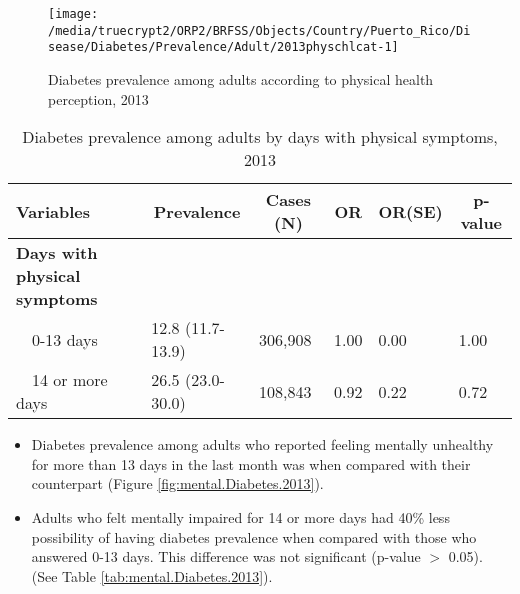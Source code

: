 \begin{figure}[H]
\caption{Diabetes prevalence among adults according to physical health perception, 2013}
\label{fig:phys.Diabetes.2013}
\begin{knitrout}
\color{fgcolor}

{\centering \texttt{[image: /media/truecrypt2/ORP2/BRFSS/Objects/Country/Puerto\_Rico/Disease/Diabetes/Prevalence/Adult/2013physchlcat-1]} 

}



\end{knitrout}
 \end{figure}

\begin{table}[H]
\caption{Diabetes prevalence among adults by days with physical symptoms, 2013\label{tab:phys.Diabetes.2013}} 
\begin{center}
\begin{tabular}{llllll}
\hline\hline
\multicolumn{1}{l}{Variables}&\multicolumn{1}{c}{Prevalence}&\multicolumn{1}{c}{Cases (N)}&\multicolumn{1}{c}{OR}&\multicolumn{1}{c}{OR(SE)}&\multicolumn{1}{c}{p-value}\tabularnewline
\hline
{\bfseries Days with physical symptoms}&&&&&\tabularnewline
~~0-13 days&12.8 (11.7-13.9)&306,908&1.00&0.00&1.00\tabularnewline
~~14 or more days&26.5 (23.0-30.0)&108,843&0.92&0.22&0.72\tabularnewline
\hline
\end{tabular}\end{center}

\end{table}


 \newpage
\begin{itemize}

\item Diabetes prevalence among adults who reported feeling mentally unhealthy for more than 13 days in the last month was  when compared with their counterpart (Figure \ref{fig:mental.Diabetes.2013}).


\item  Adults who felt mentally impaired for 14 or more days had 40\% less possibility of having diabetes prevalence when compared with those who answered 0-13 days. This difference was not significant (p-value $>$ 0.05). (See Table \ref{tab:mental.Diabetes.2013}).

\end{itemize}

